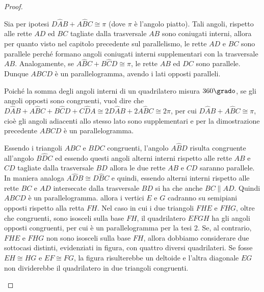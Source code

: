 \begin{proof}~\\
  \begin{enumerate*}
    \item Sia per ipotesi $D\widehat{A}B+A\widehat{B}C\cong \pi$ (dove 
    $\pi$ è l'angolo piatto). Tali angoli, rispetto alle rette $AD$ ed 
    $BC$ tagliate dalla trasversale $AB$ sono coniugati interni, allora 
    per quanto visto nel capitolo precedente sul parallelismo, le rette 
    $AD$ e $BC$ sono parallele perché formano angoli coniugati interni 
    supplementari con la trasversale $AB$. Analogamente, se 
    $A\widehat{B}C+B\widehat{C}D\cong \pi$, le rette $AB$ ed $DC$ sono 
    parallele. Dunque $ABCD$ è un parallelogramma, avendo i lati opposti 
    paralleli.
    \item Poiché la somma degli angoli interni di un quadrilatero misura 
    $360\grado$, se gli angoli opposti sono congruenti, vuol dire che 
    $D\widehat{A}B+A\widehat{B}C+B\widehat{C}D+C\widehat{D}A\cong 
    2D\widehat{A}B+2A\widehat{B}C\cong 2\pi$, per cui 
    $D\widehat{A}B+A\widehat{B}C\cong\pi$, cioè gli angoli adiacenti allo 
    stesso lato sono supplementari e per la dimostrazione precedente 
    $ABCD$ è un parallelogramma.
    \item Essendo i triangoli $ABC$ e $BDC$ congruenti, l'angolo 
    $A\widehat{B}D$ risulta congruente all'angolo $B\widehat{D}C$ ed 
    essendo questi angoli alterni interni rispetto alle rette $AB$ e $CD$ 
    tagliate dalla trasversale $BD$ allora le due rette $AB$ e $CD$ 
    saranno parallele. In maniera analoga $A\widehat{D}B\cong 
    D\widehat{B}C$ e quindi, essendo alterni interni rispetto alle rette 
    $BC$ e $AD$ intersecate dalla trasversale $BD$ si ha che anche 
    $BC\parallel AD$. Quindi $ABCD$ è un parallelogramma.
    allora i vertici $E$ e $G$ cadranno su semipiani opposti rispetto 
    alla retta $FH$. Nel caso in cui i due triangoli $FHE$ e $FHG$, oltre 
    che congruenti, sono isosceli sulla base $FH$, il quadrilatero $EFGH$ 
    ha gli angoli opposti congruenti, per cui è un parallelogramma per la 
    tesi 2. Se, al contrario, $FHE$ e $FHG$ non sono isosceli sulla base 
    $FH$, allora dobbiamo considerare due sottocasi distinti, evidenziati 
    in figura, con quattro diversi quadrilateri. Se fosse $EH\cong HG$ e 
    $EF\cong FG$, la figura risulterebbe un deltoide e l'altra diagonale 
    $EG$ non dividerebbe il quadrilatero in due triangoli congruenti. 

\end{enumerate*}
\end{proof}
